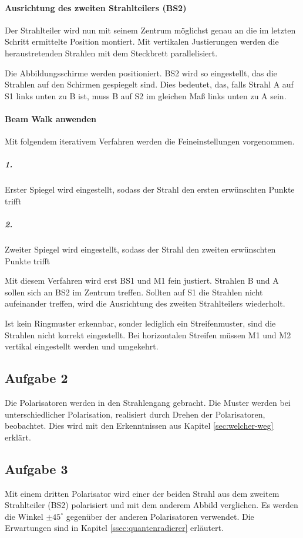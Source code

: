\documentclass[a4paper,ngerman]{scrartcl}
\begin{document}
\paragraph{Ausrichtung des zweiten Strahlteilers (BS2)}
Der Strahlteiler wird nun mit seinem Zentrum möglichst genau an die im letzten Schritt ermittelte Position montiert. Mit vertikalen Justierungen werden die heraustretenden Strahlen mit dem Steckbrett parallelisiert.

Die Abbildungsschirme werden positioniert. BS2 wird so eingestellt, das die Strahlen auf den Schirmen gespiegelt sind. Dies bedeutet, das, falls Strahl A auf S1 links unten zu B ist, muss B auf S2 im gleichen Maß links unten zu A sein.


\paragraph{Beam Walk anwenden}
Mit folgendem iterativem Verfahren werden die Feineinstellungen vorgenommen.
\subparagraph{1.}
Erster Spiegel wird eingestellt, sodass der Strahl den ersten erwünschten Punkte trifft
\subparagraph{2.}
Zweiter Spiegel wird eingestellt, sodass der Strahl den zweiten erwünschten Punkte trifft

Mit diesem Verfahren wird erst BS1 und M1 fein justiert. Strahlen B und A sollen sich an BS2 im Zentrum treffen.
Sollten auf S1 die Strahlen nicht aufeinander treffen, wird die Ausrichtung des zweiten Strahlteilers wiederholt.

Ist kein Ringmuster erkennbar, sonder lediglich ein Streifenmuster, sind die Strahlen nicht korrekt eingestellt. Bei horizontalen Streifen müssen M1 und M2 vertikal eingestellt werden und umgekehrt.

\subsection{Aufgabe 2}
Die Polarisatoren werden in den Strahlengang gebracht. Die Muster werden bei unterschiedlicher Polarisation, realisiert durch Drehen der Polarisatoren, beobachtet. Dies wird mit den Erkenntnissen aus Kapitel \ref{sec:welcher-weg} erklärt.

\subsection{Aufgabe 3}

Mit einem dritten Polarisator wird einer der beiden Strahl aus dem zweitem Strahlteiler (BS2) polarisiert und mit dem anderem Abbild verglichen. Es werden die Winkel $\pm 45^\circ$ gegenüber der anderen Polarisatoren verwendet. Die Erwartungen  sind in Kapitel \ref{ssec:quantenradierer} erläutert.
\end{document}
